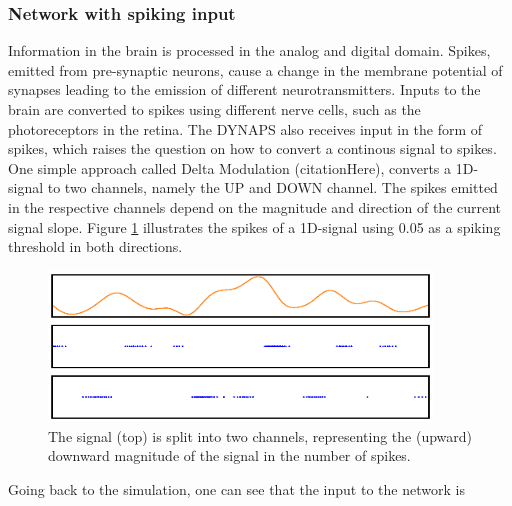 \documentclass[twoside,11pt]{article}
\begin{document}
\subsubsection{Network with spiking input} \label{sec:spiking-input}
Information in the brain is processed in the analog and digital domain. Spikes, emitted from pre-synaptic
neurons, cause a change in the membrane potential of synapses leading to the emission of different
neurotransmitters. Inputs to the brain are converted to spikes using different nerve cells, such as the
photoreceptors in the retina. The DYNAPS also receives input in the form of spikes, which raises the question
on how to convert a continous signal to spikes. One simple approach called Delta Modulation (citationHere),
converts a 1D-signal to two channels, namely the UP and DOWN channel. The spikes emitted in the respective
channels depend on the magnitude and direction of the current signal slope. Figure \ref{fig:delta_modulated_input}
illustrates the spikes of a 1D-signal using 0.05 as a spiking threshold in both directions.


\begin{figure}[!htb]
  \includegraphics[width = \columnwidth, height=4cm]{figures/delta_modulated_input.eps}
  \caption{The signal (top) is split into two channels, representing the (upward) downward
  magnitude of the signal in the number of spikes.}
  \label{fig:delta_modulated_input}
\end{figure}

Going back to the simulation, one can see that the input to the network is 
\end{document}
